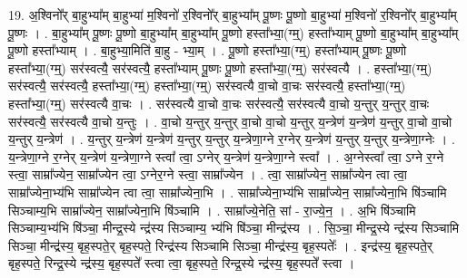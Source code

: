 \documentclass[17pt]{extarticle}
\begin{document}
19. अ॒श्विनो᳚र् बा॒हुभ्या᳚म् बा॒हुभ्या॑ म॒श्विनो॑ र॒श्विनो᳚र् बा॒हुभ्या᳚म् पू॒ष्णः पू॒ष्णो बा॒हुभ्या॑ म॒श्विनो॑ र॒श्विनो᳚र् बा॒हुभ्या᳚म् पू॒ष्णः । . बा॒हुभ्या᳚म् पू॒ष्णः पू॒ष्णो बा॒हुभ्या᳚म् बा॒हुभ्या᳚म् पू॒ष्णो हस्ता᳚भ्या॒(ग्म्॒) हस्ता᳚भ्याम् पू॒ष्णो बा॒हुभ्या᳚म् बा॒हुभ्या᳚म् पू॒ष्णो हस्ता᳚भ्याम् । . बा॒हुभ्या॒मिति॑ बा॒हु - भ्या॒म् । . पू॒ष्णो हस्ता᳚भ्या॒(ग्म्॒) हस्ता᳚भ्याम् पू॒ष्णः पू॒ष्णो हस्ता᳚भ्या॒(ग्म्॒) सर॑स्वत्यै॒ सर॑स्वत्यै॒ हस्ता᳚भ्याम् पू॒ष्णः पू॒ष्णो हस्ता᳚भ्या॒(ग्म्॒) सर॑स्वत्यै । . हस्ता᳚भ्या॒(ग्म्॒) सर॑स्वत्यै॒ सर॑स्वत्यै॒ हस्ता᳚भ्या॒(ग्म्॒) हस्ता᳚भ्या॒(ग्म्॒) सर॑स्वत्यै वा॒चो वा॒चः सर॑स्वत्यै॒ हस्ता᳚भ्या॒(ग्म्॒) हस्ता᳚भ्या॒(ग्म्॒) सर॑स्वत्यै वा॒चः । . सर॑स्वत्यै वा॒चो वा॒चः सर॑स्वत्यै॒ सर॑स्वत्यै वा॒चो य॒न्तुर् य॒न्तुर् वा॒चः सर॑स्वत्यै॒ सर॑स्वत्यै वा॒चो य॒न्तुः । . वा॒चो य॒न्तुर् य॒न्तुर् वा॒चो वा॒चो य॒न्तुर् य॒न्त्रेण॑ य॒न्त्रेण॑ य॒न्तुर् वा॒चो वा॒चो य॒न्तुर् य॒न्त्रेण॑ । . य॒न्तुर् य॒न्त्रेण॑ य॒न्त्रेण॑ य॒न्तुर् य॒न्तुर् य॒न्त्रेणा॒ग्ने र॒ग्नेर् य॒न्त्रेण॑ य॒न्तुर् य॒न्तुर् य॒न्त्रेणा॒ग्नेः । . य॒न्त्रेणा॒ग्ने र॒ग्नेर् य॒न्त्रेण॑ य॒न्त्रेणा॒ग्ने स्त्वा᳚ त्वा॒ ऽग्नेर् य॒न्त्रेण॑ य॒न्त्रेणा॒ग्ने स्त्वा᳚ । . अ॒ग्नेस्त्वा᳚ त्वा॒ ऽग्ने र॒ग्ने स्त्वा॒ साम्रा᳚ज्येन॒ साम्रा᳚ज्येन त्वा॒ ऽग्नेर॒ग्ने स्त्वा॒ साम्रा᳚ज्येन । . त्वा॒ साम्रा᳚ज्येन॒ साम्रा᳚ज्येन त्वा त्वा॒ साम्रा᳚ज्येना॒भ्य॑भि साम्रा᳚ज्येन त्वा त्वा॒ साम्रा᳚ज्येना॒भि । . साम्रा᳚ज्येना॒भ्य॑भि साम्रा᳚ज्येन॒ साम्रा᳚ज्येना॒भि षि॑ञ्चामि सिञ्चाम्य॒भि साम्रा᳚ज्येन॒ साम्रा᳚ज्येना॒भि षि॑ञ्चामि । . साम्रा᳚ज्ये॒नेति॒ सां - रा॒ज्ये॒न॒ । . अ॒भि षि॑ञ्चामि सिञ्चाम्य॒भ्य॑भि षि॑ञ्चा॒ मीन्द्र॒स्ये न्द्र॑स्य सिञ्चाम्य॒ भ्य॑भि षि॑ञ्चा॒ मीन्द्र॑स्य । . सि॒ञ्चा॒ मीन्द्र॒स्ये न्द्र॑स्य सिञ्चामि सिञ्चा॒ मीन्द्र॑स्य॒ बृह॒स्पते॒र् बृह॒स्पते॒ रिन्द्र॑स्य सिञ्चामि सिञ्चा॒ मीन्द्र॑स्य॒ बृह॒स्पतेः᳚ । . इन्द्र॑स्य॒ बृह॒स्पते॒र् बृह॒स्पते॒ रिन्द्र॒स्ये न्द्र॑स्य॒ बृह॒स्पते᳚ स्त्वा त्वा॒ बृह॒स्पते॒ रिन्द्र॒स्ये न्द्र॑स्य॒ बृह॒स्पते᳚ स्त्वा । \newline
\end{document}
